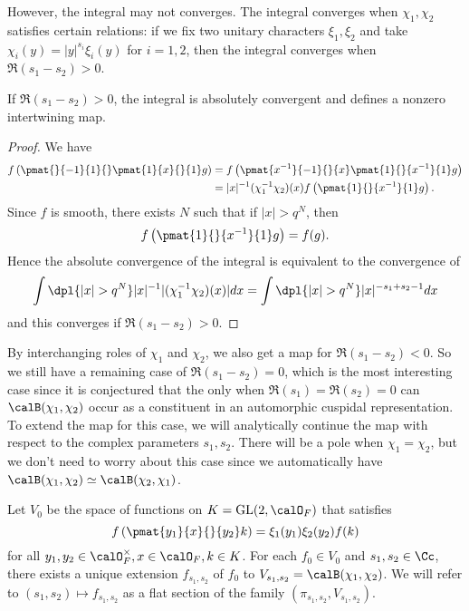 However, the integral may not converges. The integral converges when $\chi_1, \chi_2$ satisfies certain relations: if we fix two unitary characters $\xi_1, \xi_2$ and take $\chi_i(y) = |y|^{s_i}\xi_i(y)$ for $i = 1,2$, then the integral converges when $\Re(s_1 - s_2) >0$. 
\begin{proposition}
If $\Re(s_1 - s_2) >0$, the integral is absolutely convergent and defines a nonzero intertwining map. 
\end{proposition}
\begin{proof}
We have
\begin{align*}
f\left(\pmat{}{-1}{1}{}\pmat{1}{x}{}{1}g\right) &= f\left( \pmat{x^{-1}}{-1}{}{x} \pmat{1}{}{x^{-1}}{1} g\right) \\
&= |x|^{-1}(\chi_{1}^{-1}\chi_{2})(x) f\left( \pmat{1}{}{x^{-1}}{1}g\right).
\end{align*}
Since $f$ is smooth, there exists $N$ such that if $|x|>q^N$, then $$f\left( \pmat{1}{}{x^{-1}}{1}g\right) = f(g).$$ 
Hence the absolute convergence of the integral is equivalent to the convergence of 
$$
\int\dpl{|x|>q^N} |x|^{-1}|(\chi_{1}^{-1}\chi_{2})(x)| dx = \int\dpl{|x|>q^N} |x|^{-s_{1} + s_{2} - 1} dx
$$
and this converges if $\Re(s_1 - s_2) >0$. 
\end{proof}
By interchanging roles of $\chi_1$ and $\chi_2$, we also get a map for $\Re(s_1 - s_2) <0$. 
So we still have a remaining case of $\Re(s_1 - s_2) =0$, which is the most interesting case since it is conjectured that the only when $\Re(s_1) = \Re(s_2) = 0$ can $\calB(\chi_1, \chi_2)$ occur as a constituent in an automorphic cuspidal representation. 
To extend the map for this case, we will analytically continue the map with respect to the complex parameters $s_1, s_2$. There will be a pole when $\chi_1 = \chi_2$, but we don't need to worry about this case since we automatically have $\calB(\chi_1, \chi_2) \simeq \calB(\chi_2, \chi_1)$. 

Let $V_0$ be the space of functions on $K = \GL(2, \calO_F)$ that satisfies
$$
f\left( \pmat{y_{1}}{x}{}{y_{2}}k\right) = \xi_1(y_1)\xi_2(y_2)f(k)
$$
for all $y_1, y_2\in \calO^{\times}_F, x\in \calO_F, k\in K$. For each $f_{0}\in V_{0}$ and $s_1, s_2\in\Cc$, there exists a unique extension $f_{s_{1}, s_{2}}$ of $f_{0}$ to $V_{s_{1}, s_{2}} = \calB(\chi_{1}, \chi_{2})$. We will refer to $(s_{1}, s_{2}) \mapsto f_{s_{1}, s_{2}}$ as a flat section of the family $(\pi_{s_{1}, s_{2}}, V_{s_{1}, s_{2}})$. 

